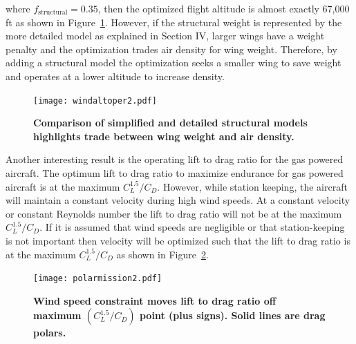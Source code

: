 where $f_{\text{structural}} = 0.35$, then the optimized flight altitude is almost exactly 67,000 ft as shown in Figure~\ref{f:altoper}.  
However, if the structural weight is represented by the more detailed model as explained in Section IV, larger wings have a weight penalty and the optimization trades air density for wing weight.
Therefore, by adding a structural model the optimization seeks a smaller wing to save weight and operates at a lower altitude to increase density. 

\begin{figure}[H]
	\begin{center}
	\texttt{[image: windaltoper2.pdf]}
 \caption{\textbf{Comparison of simplified and detailed structural models highlights trade between wing weight and air density.}}
 \label{f:altoper}
	\end{center}
\end{figure}

Another interesting result is the operating lift to drag ratio for the gas powered aircraft.  
The optimum lift to drag ratio to maximize endurance for gas powered aircraft is at the maximum $C_L^{1.5}/C_D$.\cite{br2}  
However, while station keeping, the aircraft will maintain a constant velocity during high wind speeds.  
At a constant velocity or constant Reynolds number the lift to drag ratio will not be at the maximum $C_L^{1.5}/C_D$.  
If it is assumed that wind speeds are negligible or that station-keeping is not important then velocity will be optimized such that the lift to drag ratio is at the maximum $C_L^{1.5}/C_D$ as shown in Figure~\ref{f:polarmission}.

\begin{figure}[H]
	\begin{center}
	\texttt{[image: polarmission2.pdf]}
    \caption{\textbf{Wind speed constraint moves lift to drag ratio off maximum $(C_L^{1.5}/C_D)$ point (plus signs). Solid lines are drag polars.}}
 \label{f:polarmission}
	\end{center}
\end{figure}

\DIFdelbegin {}%

